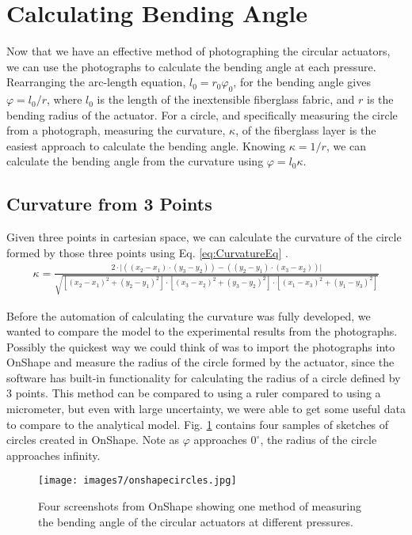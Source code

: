 \section{Calculating Bending Angle}

Now that we have an effective method of photographing the circular actuators, we can use the photographs to calculate the bending angle at each pressure. Rearranging the arc-length equation, $l_{0} = r_{0}\varphi_{0}$, for the bending angle gives $\varphi = l_0/r$, where $l_0$ is the length of the inextensible fiberglass fabric, and $r$ is the bending radius of the actuator. For a circle, and specifically measuring the circle from a photograph, measuring the curvature, $\kappa$, of the fiberglass layer is the easiest approach to calculate the bending angle. Knowing $\kappa = 1/r$, we can calculate the bending angle from the curvature using $\varphi = l_{0}\kappa$. 

\subsection{Curvature from 3 Points}

Given three points in cartesian space, we can calculate the curvature of the circle formed by those three points using Eq. \ref{eq:CurvatureEq} \cite{ratliff_cartesian_2019}. 
\begin{align} 
    \kappa = \frac{2\cdot\lvert((x_2-x_1)\cdot(y_3-y_2)) - ((y_2-y_1)\cdot(x_3-x_2))\rvert}{\sqrt{[(x_2-x_1)^2+(y_2-y_1)^2] \cdot [(x_3-x_2)^2+(y_3-y_2)^2] \cdot [(x_1-x_3)^2+(y_1-y_3)^2]}} 
    \label{eq:CurvatureEq} 
\end{align}

Before the automation of calculating the curvature was fully developed, we wanted to compare the model to the experimental results from the photographs. Possibly the quickest way we could think of was to import the photographs into OnShape and measure the radius of the circle formed by the actuator, since the software has built-in functionality for calculating the radius of a circle defined by 3 points. This method can be compared to using a ruler compared to using a micrometer, but even with large uncertainty, we were able to get some useful data to compare to the analytical model. Fig. \ref{fig:onshapecircles} contains four samples of sketches of circles created in OnShape. Note as $\varphi$ approaches $0^\circ$, the radius of the circle approaches infinity. 

\begin{figure}[h]
    \centering
     \texttt{[image: images7/onshapecircles.jpg]}
    \caption{Four screenshots from OnShape showing one method of measuring the bending angle of the circular actuators at different pressures.}
    \label{fig:onshapecircles}
\end{figure}

